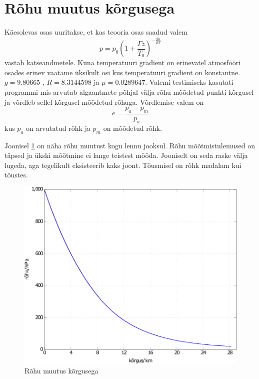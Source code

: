 \documentclass{trkut}%
\begin{document}
\section{Rõhu muutus kõrgusega}
Käesolevas osas uuritakse, et kas teooria osas saadud valem
\begin{equation*}
p = p_0 \left(1+\frac{\Gamma z}{T_0}\right)^{-\frac{g\mu}{R\Gamma}}
\end{equation*}
vastab katseandmetele. Kuna temperatuuri gradient on erinevatel atmosfööri osades erinev vaatame üksikult osi kus temperatuuri gradient on konstantne. $g = 9.80665 $ , $R = 8.3144598$ ja $\mu = 0.0289647$. Valemi testimiseks kasutati programmi mis arvutab algaantmete põhjal välja rõhu mõõdetud punkti kõrgusel ja võrdleb sellel kõrgusel mõõdetud rõhuga. Võrdlemise valem on
\begin{equation*}
e = \frac{p_a-p_m}{p_a}
\end{equation*}
kus $p_a$ on arvutatud rõhk ja $p_m$ on mõõdetud rõhk.


Joonisel \ref{prekõrg} on näha rõhu muutust kogu lennu jooksul. Rõhu mõõtmistulemused on täpsed ja ükski mõõtmine ei lange teistest mööda. Jooniselt on seda raske välja lugeda, aga tegelikult eksisteerib kaks joont. Tõusmisel on rõhk madalam kui tõustes.

\begin{figure}[h]
	\includegraphics[width=1\textwidth]{PicGra/prekõrg.pdf}
	\caption{Rõhu muutus kõrgusega}
	\label{prekõrg}%
\end{figure}
\end{document}
